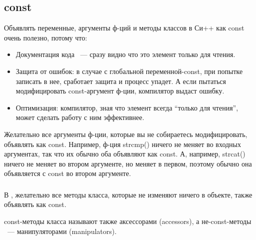 ﻿\subsection{const}

Объявлять переменные, аргументы ф-ций и методы классов в Си++ как const очень полезно, потому что:

\begin{itemize}
\item
Документация кода ~--- сразу видно что это элемент только для чтения.

\item
Защита от ошибок: в случае с глобальной переменной-const, при попытке записать в нее, 
сработает защита и процесс упадет.
А если пытаться модифицировать const-аргумент ф-ции, компилятор выдаст ошибку.

\item
Оптимизация: компилятор, зная что элемент всегда ``только для чтения'', может сделать работу с ним эффективнее.
\end{itemize}

Желательно все аргументы ф-ции, которые вы не собираетесь модифицировать, объявлять как const.
Например, ф-ция strcmp() ничего не меняет во входных аргументах, так что их обычно оба объявляют как const.
А, например, strcat() ничего не меняет во втором аргументе, но меняет в первом, поэтому обычно она объявляется
с const во втором аргументе.

\subsubsection{\CPP}

В \CPP, желательно все методы класса, которые не изменяют ничего в объекте, 
также объявлять как const.

const-методы класса называют также аксессорами (accessors), 
а не-const-методы ~--- манипуляторами (manipulators)\cite{Lakos}.
